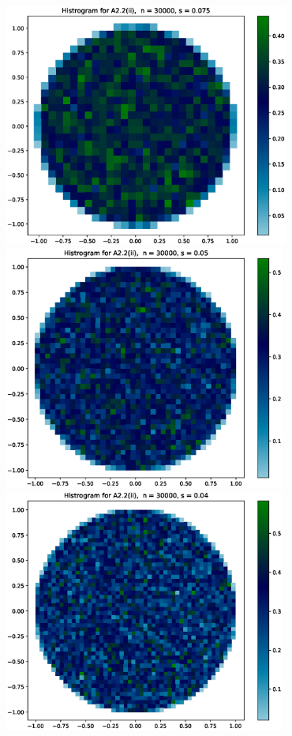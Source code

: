\documentclass{article}
\begin{document}
\includegraphics[height=8cm]{Figures_for_A2.2_ii//4.eps}\\
\hspace*{-1.5cm}\includegraphics[height=8cm]{Figures_for_A2.2_ii//5.eps} \hspace*{-1.5cm}
\includegraphics[height=8cm]{Figures_for_A2.2_ii//6.eps}\\
\end{document}
